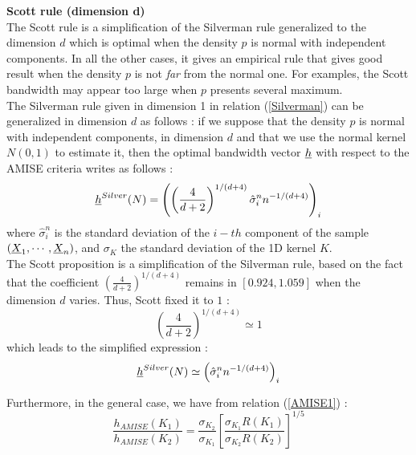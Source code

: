 {  \textbf{Scott rule (dimension d)}\\

  The Scott rule is a simplification of the Silverman rule generalized to the dimension $d$ which is optimal when the density $p$ is normal with independent components. In all the other cases, it gives an empirical rule that gives good result when the density $p$ is not \emph{far} from the normal one. For examples, the Scott bandwidth may appear too large when $p$ presents several maximum.\\

  The Silverman rule given in dimension 1 in relation (\ref{Silverman}) can be generalized in dimension $d$ as follows : if we suppose  that the density $p$ is normal with independent components, in dimension $d$ and that we use the normal kernel $N(0,1)$ to estimate it, then the optimal bandwidth vector ${\underline{h}}$ with respect to the AMISE criteria writes as follows :
  \begin{equation}
    \label{SilvermanNormalKernel}
    {\underline{h}}^{Silver}(N) = \left(\left(\frac{4}{d+2}\right)^{1/(d+4)}\hat{\sigma}_i^n n^{-1/(d+4)}\right)_i
  \end{equation}
  where $\hat{\sigma}_i^n$ is the standard deviation of the $i-th$ component of the sample $({\underline{X}}_1, \cdots, {\underline{X}}_n)$, and $\sigma_K$ the standard deviation of the 1D kernel $K$.\\



  The Scott proposition is  a simplification of the Silverman rule, based on the fact that the coefficient $\left(\frac{4}{d+2}\right)^{1/(d+4)}$ remains in $[0.924, 1.059]$ when the dimension $d$ varies. Thus, Scott fixed it to $1$ :
  \begin{equation}
    \label{coefficientScott}
    \left(\frac{4}{d+2}\right)^{1/(d+4)} \simeq 1
  \end{equation}
  which leads to the simplified expression :
  \begin{equation}
    \label{SilvermanNormalKernelSimplif}
    {\underline{h}}^{Silver}(N) \simeq \left( \hat{\sigma}_i^n n^{-1/(d+4)}\right)_i
  \end{equation}




  Furthermore, in the general case, we have from relation (\ref{AMISE1}) :
  \begin{equation}
    \label{ChangeBandwidth}
    \frac{h_{AMISE}(K_1)}{h_{AMISE}(K_2)}=\frac{\sigma_{K_2}}{\sigma_{K_1}}\left[\frac{\sigma_{K_1}R(K_1)}{\sigma_{K_2}R(K_2)}\right]^{1/5}
  \end{equation}

}

